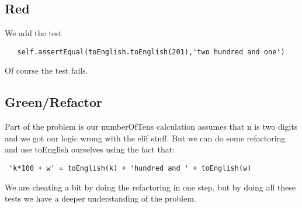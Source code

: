\documentclass{paper}
\begin{document}
\subsection{Red}
We add the test
\begin{lstlisting}
   self.assertEqual(toEnglish.toEnglish(201),'two hundred and one')
\end{lstlisting}
Of course the test fails. 
\subsection{Green/Refactor}
Part of the problem is our numberOfTens calculation assumes that n is
two digits and we got our logic wrong with the elif stuff. But we can
do some refactoring and use toEnglish ourselves using the fact that:
\begin{lstlisting}
 'k*100 + w' = toEnglish(k) + 'hundred and ' + toEnglish(w)  
\end{lstlisting}

We are cheating a bit by doing the refactoring in one step, but by
doing all these tests we have a deeper understanding of the problem.
\end{document}
